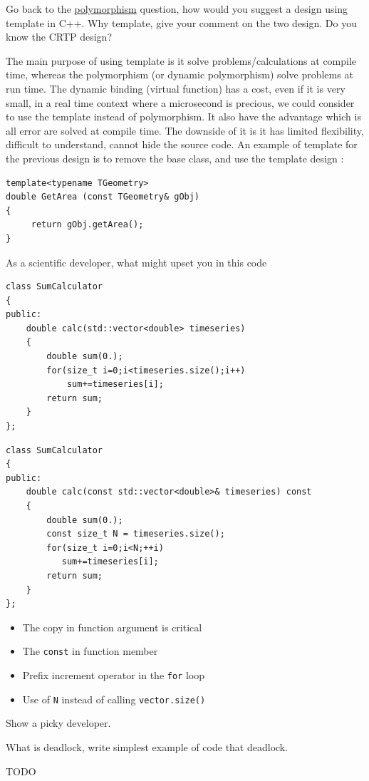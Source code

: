 \documentclass{exam}%
\begin{document}
\begin{questions}
\question Go back to the \hyperref[cpp:dynamic_polymorphism]{polymorphism} question, how would you suggest a design using template in C++. Why template, give your comment on the two design. Do you know the CRTP design?
\begin{solution}[.2in]
The main purpose of using template is it solve problems/calculations at compile time, whereas the polymorphism (or dynamic polymorphism) solve problems at run time. The dynamic binding (virtual function) has a cost, even if it is very small, in a real time context where a microsecond is precious, we could consider to use the template instead of polymorphism. It also have the advantage which is all error are solved at compile time. The downside of it is it has limited flexibility, difficult to understand, cannot hide the source code. An example of template for the previous design is to remove the base class, and use the template design :
\begin{lstlisting}
template<typename TGeometry>
double GetArea (const TGeometry& gObj)
{
	 return gObj.getArea();
}
\end{lstlisting}
\end{solution}

\question As a scientific developer, what might upset you in this code 
\begin{lstlisting}
class SumCalculator
{
public:
	double calc(std::vector<double> timeseries)
	{
		double sum(0.);
		for(size_t i=0;i<timeseries.size();i++)
		    sum+=timeseries[i];
		return sum;
	}
};
\end{lstlisting}
\begin{solution}[.2in] 
\begin{lstlisting}
class SumCalculator
{
public:
	double calc(const std::vector<double>& timeseries) const
	{
		double sum(0.);
		const size_t N = timeseries.size();
		for(size_t i=0;i<N;++i)
		   sum+=timeseries[i];
		return sum;
	}
};
\end{lstlisting}
\begin{itemize}
	\item The copy in function argument is critical
	\item The \lstinline{const} in function member
	\item Prefix increment operator in the \lstinline{for} loop
	\item Use of \lstinline{N} instead of calling \lstinline{vector.size()}
\end{itemize}
Show a picky developer.
\end{solution}

\question What is deadlock, write simplest example of code that deadlock.
\begin{solution}[.2in]
TODO
\end{solution}

\end{questions}
\fi
%
%
\end{document}

